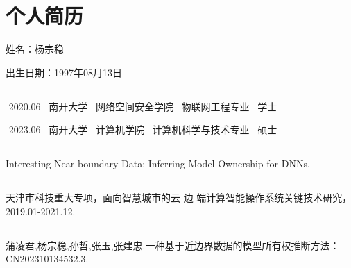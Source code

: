
\chapter*{个人简历}


\noindent 姓名：杨宗稳

\noindent 出生日期：1997年08月13日

\section*{}

-2020.06 \quad\ 南开大学 \quad\ 网络空间安全学院 \quad\ 物联网工程专业 \quad\ 学士

-2023.06 \quad\ 南开大学 \quad\ 计算机学院 \quad\ 计算机科学与技术专业 \quad\ 硕士

\section*{}

\noindent Interesting Near-boundary Data: Inferring Model Ownership for DNNs.

\section*{}

\noindent 天津市科技重大专项，面向智慧城市的云-边-端计算智能操作系统关键技术研究，2019.01-2021.12.

\section*{}

\noindent 蒲凌君,杨宗稳,孙哲,张玉,张建忠.一种基于近边界数据的模型所有权推断方法：CN202310134532.3.


%




